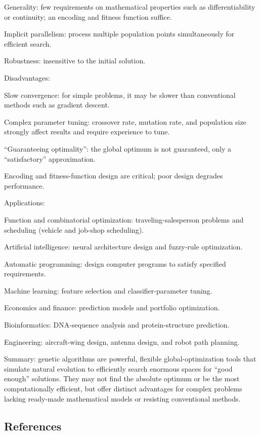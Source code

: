 Generality: few requirements on mathematical properties such as differentiability or continuity; an encoding and fitness function suffice.

Implicit parallelism: process multiple population points simultaneously for efficient search.

Robustness: insensitive to the initial solution.

Disadvantages:

Slow convergence: for simple problems, it may be slower than conventional methods such as gradient descent.

Complex parameter tuning: crossover rate, mutation rate, and population size strongly affect results and require experience to tune.

``Guaranteeing optimality'': the global optimum is not guaranteed, only a ``satisfactory'' approximation.

Encoding and fitness-function design are critical; poor design degrades performance.

Applications:

Function and combinatorial optimization: traveling-salesperson problems and scheduling (vehicle and job-shop scheduling).

Artificial intelligence: neural architecture design and fuzzy-rule optimization.

Automatic programming: design computer programs to satisfy specified requirements.

Machine learning: feature selection and classifier-parameter tuning.

Economics and finance: prediction models and portfolio optimization.

Bioinformatics: DNA-sequence analysis and protein-structure prediction.

Engineering: aircraft-wing design, antenna design, and robot path planning.

Summary: genetic algorithms are powerful, flexible global-optimization tools that simulate natural evolution to efficiently search enormous spaces for ``good enough'' solutions. They may not find the absolute optimum or be the most computationally efficient, but offer distinct advantages for complex problems lacking ready-made mathematical models or resisting conventional methods.

\FloatBarrier
{}
\hypertarget{references-31}{%
\subsection{References}\label{references-31}}

